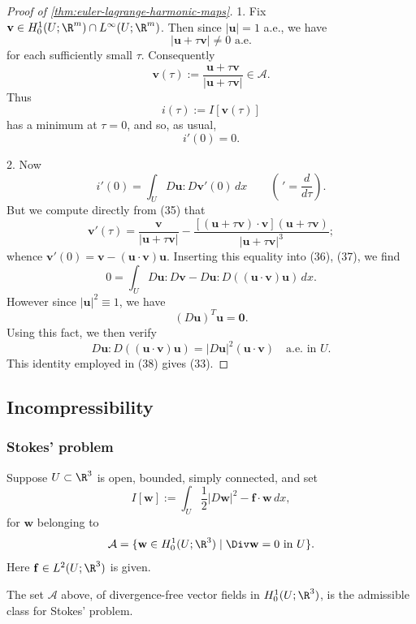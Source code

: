 \begin{proof}[Proof of \cref{thm:euler-lagrange-harmonic-maps}]
1. Fix $\mathbf{v} \in H_0^1(U;\R^m) \cap L^\infty(U;\R^m)$. Then since $|\mathbf{u}| = 1$ a.e., we have
\[
|\mathbf{u} + \tau \mathbf{v}| \neq 0 \text{ a.e.}
\]
for each sufficiently small $\tau$. Consequently
\[
\mathbf{v}(\tau) := \frac{\mathbf{u} + \tau\mathbf{v}}{|\mathbf{u}+\tau\mathbf{v}|} \in \mathcal{A}.
\tag{35}
\]
Thus
\[
i(\tau) := I[\mathbf{v}(\tau)]
\]
has a minimum at $\tau = 0$, and so, as usual,
\[
i'(0) = 0.
\tag{36}
\]

2. Now
\[
i'(0) = \int_U D\mathbf{u} : D\mathbf{v}'(0)\, dx \qquad \left(\, ' = \frac{d}{d\tau}\right).
\tag{37}
\]
But we compute directly from (35) that
\[
\mathbf{v}'(\tau) = \frac{\mathbf{v}}{|\mathbf{u}+\tau\mathbf{v}|} - \frac{[(\mathbf{u}+\tau\mathbf{v})\cdot \mathbf{v}](\mathbf{u}+\tau\mathbf{v})}{|\mathbf{u}+\tau\mathbf{v}|^3};
\]
whence $\mathbf{v}'(0) = \mathbf{v} - (\mathbf{u}\cdot\mathbf{v})\mathbf{u}$. Inserting this equality into (36), (37), we find
\[
0 = \int_U D\mathbf{u} : D\mathbf{v} - D\mathbf{u} : D((\mathbf{u}\cdot\mathbf{v})\mathbf{u})\, dx.
\tag{38}
\]
However since $|\mathbf{u}|^2 \equiv 1$, we have
\[
(D\mathbf{u})^T\mathbf{u} = \mathbf{0}.
\]
Using this fact, we then verify
\[
D\mathbf{u}:D((\mathbf{u}\cdot\mathbf{v})\mathbf{u}) = |D\mathbf{u}|^2(\mathbf{u}\cdot\mathbf{v}) \quad \text{a.e. in } U.
\]
This identity employed in (38) gives (33).
\end{proof}

\subsection{Incompressibility}
\label{sec:incompressibility-constraints}

\subsubsection{Stokes' problem}

Suppose $U \subset \R^3$ is open, bounded, simply connected, and set
\[
I[\mathbf{w}] := \int_U \frac{1}{2}|D\mathbf{w}|^2 - \mathbf{f} \cdot \mathbf{w}\, dx,
\]
for $\mathbf{w}$ belonging to
\[
\mathcal{A} = \{\mathbf{w} \in H_0^1(U; \R^3) \mid \Div \mathbf{w} = 0 \text{ in } U\}.
\]
Here $\mathbf{f} \in L^2(U; \R^3)$ is given.

\begin{definition}
\label{def:admissible-class-stokes-problem}
The set $\mathcal{A}$ above, of divergence-free vector fields in $H_0^1(U;\R^3)$, is the admissible class for Stokes' problem.
\end{definition}

